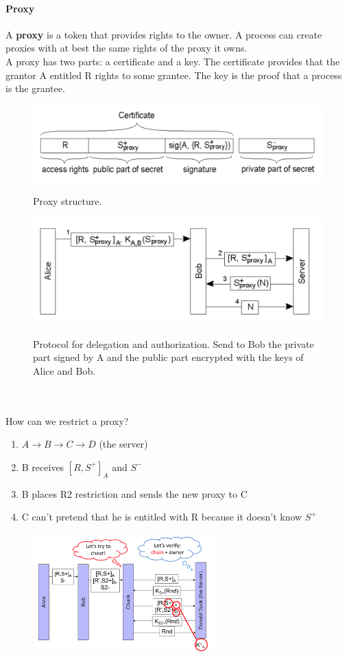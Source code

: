 \documentclass[10pt,a4paper]{article}
\begin{document}
\paragraph{Proxy}
A \textbf{proxy} is a token that provides rights to the owner. A process can create proxies with at best the same rights of the proxy it owns. \\ A proxy has two parts: a certificate and a key. The certificate provides that the grantor A entitled R rights to some grantee. The key is the proof that a process is the grantee.
\begin{figure}[h!]
\centering
\begin{minipage}{.5\textwidth}
  \centering
  \includegraphics[width=.8\linewidth]{images/proxy.png}
  \label{fig:proxy}
  \caption{Proxy structure.}
\end{minipage}%
\begin{minipage}{.5\textwidth}
  \centering
  \includegraphics[width=.8\linewidth]{images/proxy2.png}
  \label{fig:proxy2}
  \caption{Protocol for delegation and authorization. Send to Bob the private part signed by A and the public part encrypted with the keys of Alice and Bob.}
\end{minipage}
\end{figure} \\ 
\pagebreak \\ How can we restrict a proxy? 
\begin{enumerate}
	\item $A \rightarrow B \rightarrow C \rightarrow D$ (the server)
	\item B receives $[R, S^+]_A$ and $S^-$
	\item B places R2 restriction and sends the new proxy to C
	\item C can't pretend that he is entitled with R because it doesn't know $S^+$
\end{enumerate}
\begin{figure}[h!]\hfill \includegraphics[width=200pt]{images/proxy3.png}\hspace*{\fill}
  \label{fig:proxy3}
\end{figure}
\end{document}

